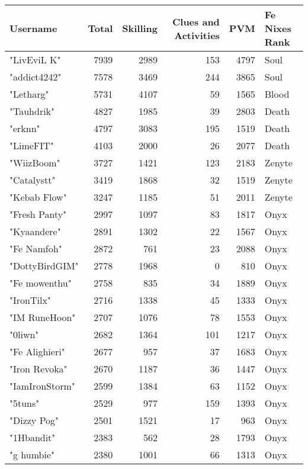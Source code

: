 \documentclass{article}
\begin{document}
\begin{table}[htbp]
\centering
{}
\begin{tabular}{|l|r|r|r|r|l|}
\hline
\textbf{Username} & \textbf{Total} & \textbf{Skilling} & \textbf{Clues and Activities} & \textbf{PVM} & \textbf{Fe Nixes Rank} \\ \hline
"LivEviL K" & 7939 & 2989 & 153 & 4797 & Soul \\ \hline
"addict4242" & 7578 & 3469 & 244 & 3865 & Soul \\ \hline
"Letharg" & 5731 & 4107 & 59 & 1565 & Blood \\ \hline
"Tauhdrik" & 4827 & 1985 & 39 & 2803 & Death \\ \hline
"erknn" & 4797 & 3083 & 195 & 1519 & Death \\ \hline
"LimeFIT" & 4103 & 2000 & 26 & 2077 & Death \\ \hline
"WiizBoom" & 3727 & 1421 & 123 & 2183 & Zenyte \\ \hline
"Catalystt" & 3419 & 1868 & 32 & 1519 & Zenyte \\ \hline
"Kebab Flow" & 3247 & 1185 & 51 & 2011 & Zenyte \\ \hline
"Fresh Panty" & 2997 & 1097 & 83 & 1817 & Onyx \\ \hline
"Kyaandere" & 2891 & 1302 & 22 & 1567 & Onyx \\ \hline
"Fe Namfoh" & 2872 & 761 & 23 & 2088 & Onyx \\ \hline
"DottyBirdGIM" & 2778 & 1968 & 0 & 810 & Onyx \\ \hline
"Fe mowenthu" & 2758 & 835 & 34 & 1889 & Onyx \\ \hline
"IronTilx" & 2716 & 1338 & 45 & 1333 & Onyx \\ \hline
"IM RuneHoon" & 2707 & 1076 & 78 & 1553 & Onyx \\ \hline
"0liwn" & 2682 & 1364 & 101 & 1217 & Onyx \\ \hline
"Fe Alighieri" & 2677 & 957 & 37 & 1683 & Onyx \\ \hline
"Iron Revoka" & 2670 & 1187 & 36 & 1447 & Onyx \\ \hline
"IamIronStorm" & 2599 & 1384 & 63 & 1152 & Onyx \\ \hline
"5tuns" & 2529 & 977 & 159 & 1393 & Onyx \\ \hline
"Dizzy Pog" & 2501 & 1521 & 17 & 963 & Onyx \\ \hline
"1Hbandit" & 2383 & 562 & 28 & 1793 & Onyx \\ \hline
"g humbie" & 2380 & 1001 & 66 & 1313 & Onyx \\ \hline

\end{tabular}
\end{table}
\end{document}
